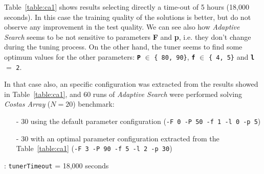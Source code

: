 Table~\ref{table:ca1} shows results selecting directly a time-out of 5 hours (18,000 seconds). In this case the training quality of the solutions is better, but do not observe any improvement in the test quality. We can see also how {\it Adaptive Search} seems to be not sensitive to parameters {\bf F} and {\bf p}, i.e. they don't change during the tuning process. On the other hand, the tuner seems to find some optimum values for the other parameters: \texttt{\bf P} $\in$ \texttt{\{ 80, 90\}}, \texttt{\bf f} $\in$ \texttt{\{ 4, 5\}} and \texttt{\bf l} $=$ \texttt{2}.

In that case also, an specific configuration was extracted from the results showed in Table~\ref{table:ca1}, and 60 runs of {\it Adaptive Search} were performed solving {\it Costas Array} ($N = 20$) benchmark: 
\begin{itemize}
	\item[-] 30 using the default parameter configuration (\texttt{-F 0 -P 50 -f 1 -l 0 -p 5})
	\item[-] 30 with an optimal parameter configuration extracted from the Table~\ref{table:ca1} (\texttt{-F 3 -P 90 -f 5 -l 2 -p 30}) 
\end{itemize}

\begin{table}[h]
\centering 
\renewcommand{\arraystretch}{1.2}
\caption{\carr{}: \texttt{tunerTimeout} = 18,000 seconds}\label{table:ca1}
\end{table}

